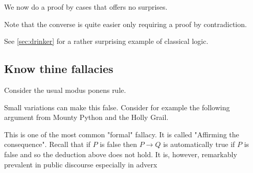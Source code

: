 We now do a proof by cases that offers no surprises.





Note that the converse is quite easier only requiring  a proof by contradiction.



See \ref{sec:drinker} for a rather surprising example of classical logic.

\subsection{Know thine fallacies}

Consider the usual modus ponens rule. 

Small variations can make this false.
 Consider for example the following argument from Mounty Python and the Holly Grail.
 
 
 
 
 
 
 This is one of the most common "formal" fallacy. It is called "Affirming the consequence". Recall that if $P$ is false then $P\rightarrow Q$ is automatically true if $P$ is false and so the deduction above does not hold. It is, however, remarkably prevalent in public discourse especially in adverx

